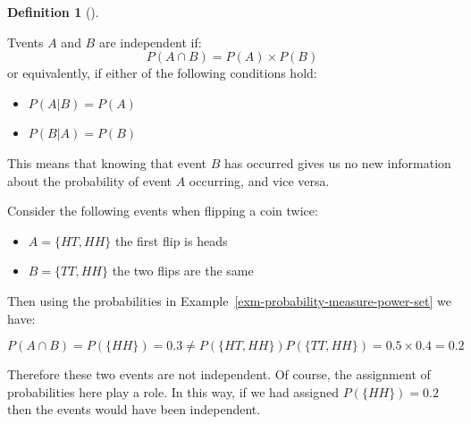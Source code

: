 \documentclass[
  letterpaper,
  DIV=11,
  numbers=noendperiod]{scrreport}
\providecommand{\tightlist}{%
  \setlength{\itemsep}{0pt}\setlength{\parskip}{0pt}}
\theoremstyle{definition}
\theoremstyle{plain}
\theoremstyle{plain}
\theoremstyle{definition}
\newtheorem{definition}{Definition}[chapter]
\theoremstyle{remark}
\begin{document}
\begin{tcolorbox}[enhanced jigsaw, opacitybacktitle=0.6, bottomtitle=1mm, opacityback=0, toprule=.15mm, colbacktitle=quarto-callout-note-color!10!white, colback=white, left=2mm, title={Independent Events}, breakable, rightrule=.15mm, leftrule=.75mm, titlerule=0mm, colframe=quarto-callout-note-color-frame, arc=.35mm, coltitle=black, toptitle=1mm, bottomrule=.15mm]

\begin{definition}[]\protect\hypertarget{def-independent-events}{}\label{def-independent-events}

Tvents \(A\) and \(B\) are independent if:
\[ P(A \cap B) = P(A) \times P(B) \] or equivalently, if either of the
following conditions hold:

\begin{itemize}
\item
  \(P(A|B) = P(A)\)
\item
  \(P(B|A) = P(B)\)
\end{itemize}

\end{definition}

\end{tcolorbox}

This means that knowing that event \(B\) has occurred gives us no new
information about the probability of event \(A\) occurring, and vice
versa.

\begin{tcolorbox}[enhanced jigsaw, opacitybacktitle=0.6, bottomtitle=1mm, opacityback=0, toprule=.15mm, colbacktitle=quarto-callout-note-color!10!white, colback=white, left=2mm, title={Independent event when flipping a coin twice}, breakable, rightrule=.15mm, leftrule=.75mm, titlerule=0mm, colframe=quarto-callout-note-color-frame, arc=.35mm, coltitle=black, toptitle=1mm, bottomrule=.15mm]

Consider the following events when flipping a coin twice:

\begin{itemize}
\tightlist
\item
  \(A=\{HT, HH\}\) the first flip is heads
\item
  \(B=\{TT, HH\}\) the two flips are the same
\end{itemize}

Then using the probabilities in
Example~\ref{exm-probability-measure-power-set} we have:

\[
P(A\cap B) = P(\{HH\}) = 0.3 \neq P(\{HT,HH\})P(\{TT,HH\}) = 0.5\times 0.4  = 0.2
\]

Therefore these two events are not independent. Of course, the
assignment of probabilities here play a role. In this way, if we had
assigned \(P(\{HH\})=0.2\) then the events would have been independent.

\end{tcolorbox}
\end{document}
